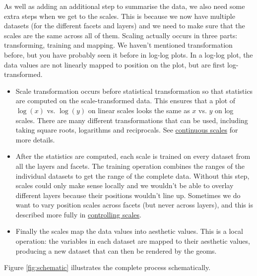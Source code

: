 As well as adding an additional step to summarise the data, we also need
some extra steps when we get to the scales. This is because we now have
multiple datasets (for the different facets and layers) and we need to
make sure that the scales are the same across all of them. Scaling
actually occurs in three parts: transforming, training and mapping. We
haven't mentioned transformation before, but you have probably seen it
before in log-log plots. In a log-log plot, the data values are not
linearly mapped to position on the plot, but are first log-transformed.

\begin{itemize}
\item
  Scale transformation occurs before statistical transformation so that
  statistics are computed on the scale-transformed data. This ensures
  that a plot of \(\log(x)\) vs. \(\log(y)\) on linear scales looks the
  same as \(x\) vs. \(y\) on log scales. There are many different
  transformations that can be used, including taking square roots,
  logarithms and reciprocals. See
  \protect\hyperlink{sub:scale-position}{continuous scales} for more
  details.
\item
  After the statistics are computed, each scale is trained on every
  dataset from all the layers and facets. The training operation
  combines the ranges of the individual datasets to get the range of the
  complete data. Without this step, scales could only make sense locally
  and we wouldn't be able to overlay different layers because their
  positions wouldn't line up. Sometimes we do want to vary position
  scales across facets (but never across layers), and this is described
  more fully in \protect\hyperlink{sub:controlling-scales}{controlling
  scales}.
\item
  Finally the scales map the data values into aesthetic values. This is
  a local operation: the variables in each dataset are mapped to their
  aesthetic values, producing a new dataset that can then be rendered by
  the geoms.
\end{itemize}

Figure \ref{fig:schematic} illustrates the complete process
schematically.


